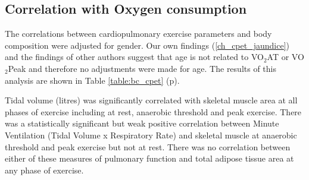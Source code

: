 
\subsection{Correlation with Oxygen consumption}

The correlations between cardiopulmonary exercise parameters and body composition were adjusted for gender. Our own findings (\ref{ch_cpet_jaundice}) and the findings of other authors suggest that age is not related to VO$_2$AT or VO$_2$Peak and therefore no adjustments were made for age. The results of this analysis are shown in Table \ref{table:bc_cpet} (p\pageref{table:bc_cpet}).


Tidal volume (litres) was significantly correlated with skeletal muscle area at all phases of exercise including at rest, anaerobic threshold and peak exercise. There was a statistically significant but weak positive correlation between Minute Ventilation (Tidal Volume x Respiratory Rate) and skeletal muscle at anaerobic threshold and peak exercise but not at rest. There was no correlation between either of these measures of pulmonary function and total adipose tissue area at any phase of exercise.

